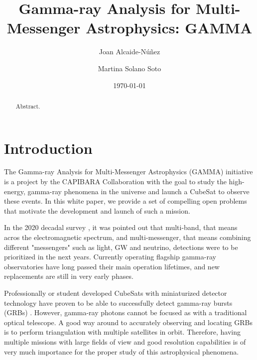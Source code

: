 \documentclass[
    aps,
    prd,
    twocolumn,
    nofootinbib,
    floatfix,
    superscriptaddress
]{revtex4-2}
\begin{document}
\title{Gamma-ray Analysis for Multi-Messenger Astrophysics: GAMMA}

\author{Joan Alcaide-Núñez}

\author{Martina Solano Soto}

\date{\today}

\maketitle

\begin{abstract}
	Abstract.
\end{abstract}

\tableofcontents
\vspace{1em}

\section{Introduction}
The Gamma-ray Analysis for Multi-Messenger Astrophysics (GAMMA) initiative is a project by the CAPIBARA Collaboration with the goal to study the high-energy, gamma-ray phenomena in the universe and launch a CubeSat to observe these events. In this white paper, we provide a set of compelling open problems that motivate the development and launch of such a mission.

In the 2020 decadal survey \cite{missing}, it was pointed out that multi-band, that means acros the electromagnetic spectrum, and multi-messenger, that means combining different "messengers" such as light, GW and neutrino, detections were to be prioritized in the next years. Currently operating flagship gamma-ray observatories have long passed their main operation lifetimes, and new replacements are still in very early phases.

Professionally or student developed CubeSats with miniaturized detector technology have proven to be able to successfully detect gamma-ray bursts (GRBs) \cite{EIRSAT-1, GRBalpha, HERMES, BurstCube}. However, gamma-ray photons cannot be focused as with a traditional optical telescope. A good way around to accurately observing and locating GRBs is to perform triangulation with multiple satellites in orbit. Therefore, having multiple missions with large fields of view and good resolution capabilities is of very much importance for the proper study of this astrophysical phenomena.
\end{document}
